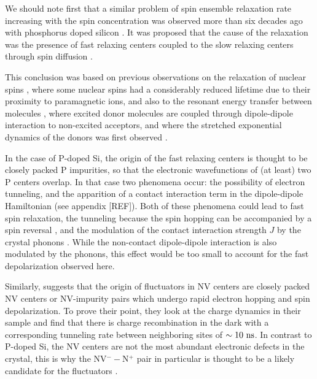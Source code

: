 \documentclass[a4paper,11pt]{report}
\begin{document}
We should note first that a similar problem of spin ensemble relaxation rate increasing with the spin concentration was observed more than six decades ago with phosphorus doped silicon \citep{feher1959electron,honig1960electron}. It was proposed that the cause of the relaxation was the presence of fast relaxing centers coupled to the slow relaxing centers through spin diffusion \citep{honig1960electron, sugihara1963spin, yang1968concentration, vugmeister1978spin, berman2005spin}. 

This conclusion was based on previous observations on the relaxation of nuclear spins \citep{bloembergen1949interaction, de1958relaxation, blumberg1960nuclear}, where some nuclear spins had a considerably reduced lifetime due to their proximity to paramagnetic ions, and also to the resonant energy transfer between molecules \citep{forster1949experimentelle, eisenthal1964influence, yokota1967effects}, where excited donor molecules are coupled through dipole-dipole interaction to non-excited acceptors, and where the stretched exponential dynamics of the donors was first observed \citep{forster1949experimentelle}.

In the case of P-doped Si, the origin of the fast relaxing centers is thought to be closely packed P impurities, so that the electronic wavefunctions of (at least) two P centers overlap. In that case two phenomena occur: the possibility of electron tunneling, and the apparition of a contact interaction term in the dipole-dipole Hamiltonian (see appendix [REF]). Both of these phenomena could lead to fast spin relaxation, the tunneling because the spin hopping can be accompanied by a spin reversal \citep{sugihara1963spin}, and the modulation of the contact interaction strength $J$ by the crystal phonons \citep{honig1960electron}. While the non-contact dipole-dipole interaction is also modulated by the phonons, this effect would be too small to account for the fast depolarization observed here.

Similarly, \citep{choi2017depolarization} suggests that the origin of fluctuators in NV centers are closely packed NV centers or NV-impurity pairs which undergo rapid electron hopping and spin depolarization. To prove their point, they look at the charge dynamics in their sample and find that there is charge recombination in the dark with a corresponding tunneling rate between neighboring sites of $\sim 10\ \rm ns$. In contrast to P-doped Si, the NV centers are not the most abundant electronic defects in the crystal, this is why the NV$^--$N$^+$ pair in particular is thought to be a likely candidate for the fluctuators \citep{manson2018nv}.
\end{document}
